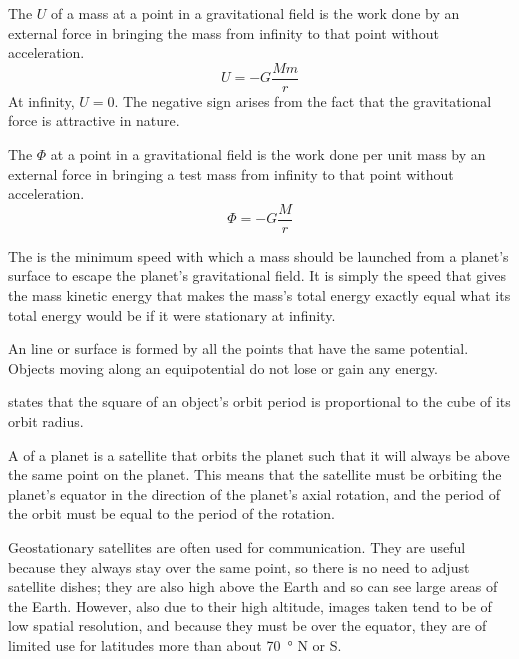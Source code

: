 \documentclass[Physics.tex]{subfiles}
\begin{document}
The  \(U\) of a mass at a point in a gravitational field is the work done by an external force in bringing the mass from infinity to that point without acceleration. \begin{equation}U = -G\frac{Mm}{r}\end{equation} At infinity, \(U = 0\). The negative sign arises from the fact that the gravitational force is attractive in nature.

The  \(\Phi\) at a point in a gravitational field is the work done per unit mass by an external force in bringing a test mass from infinity to that point without acceleration.\begin{equation}\Phi = -G\frac{M}{r}\end{equation}

The  is the minimum speed with which a mass should be launched from a planet's surface to escape the planet's gravitational field. It is simply the speed that gives the mass kinetic energy that makes the mass's total energy exactly equal what its total energy would be if it were stationary at infinity.

An  line or surface is formed by all the points that have the same potential. Objects moving along an equipotential do not lose or gain any energy.

 states that the square of an object's orbit period is proportional to the cube of its orbit radius.

A  of a planet is a satellite that orbits the planet such that it will always be above the same point on the planet. This means that the satellite must be orbiting the planet's equator in the direction of the planet's axial rotation, and the period of the orbit must be equal to the period of the rotation.

Geostationary satellites are often used for communication. They are useful because they always stay over the same point, so there is no need to adjust satellite dishes; they are also high above the Earth and so can see large areas of the Earth. However, also due to their high altitude, images taken tend to be of low spatial resolution, and because they must be over the equator, they are of limited use for latitudes more than about \SI{70}{\degree} N or S.
\end{document}
